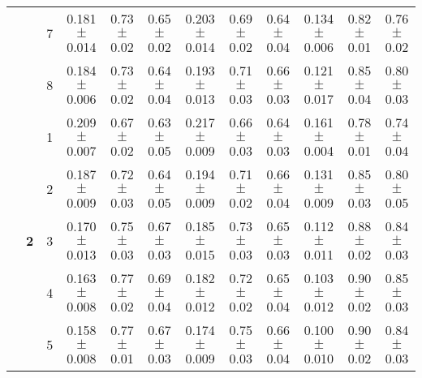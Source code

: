 \begin{table*}
{\begin{tabular}{|l|c|c||c|c|c||c|c|c||c|c|c|}
 & & 7 & \textcolor{gate_color}{0.181$\pm$0.014} & \textcolor{gate_color}{0.73$\pm$0.02} & \textcolor{gate_color}{0.65$\pm$0.02} & \textcolor{mixed_color}{0.203$\pm$0.014} & \textcolor{mixed_color}{0.69$\pm$0.02} & \textcolor{mixed_color}{0.64$\pm$0.04} & \textcolor{pulsed_color}{0.134$\pm$0.006} & \textcolor{pulsed_color}{0.82$\pm$0.01} & \textcolor{pulsed_color}{0.76$\pm$0.02} \\
 & & 8 & \textcolor{gate_color}{0.184$\pm$0.006} & \textcolor{gate_color}{0.73$\pm$0.02} & \textcolor{gate_color}{0.64$\pm$0.04} & \textcolor{mixed_color}{0.193$\pm$0.013} & \textcolor{mixed_color}{0.71$\pm$0.03} & \textcolor{mixed_color}{0.66$\pm$0.03} & \textcolor{pulsed_color}{0.121$\pm$0.017} & \textcolor{pulsed_color}{0.85$\pm$0.04} & \textcolor{pulsed_color}{0.80$\pm$0.03} \\
\cline{2-12}
 & \multirow{8}{*}{\textbf{2}} & 1 & \textcolor{gate_color}{0.209$\pm$0.007} & \textcolor{gate_color}{0.67$\pm$0.02} & \textcolor{gate_color}{0.63$\pm$0.05} & \textcolor{mixed_color}{0.217$\pm$0.009} & \textcolor{mixed_color}{0.66$\pm$0.03} & \textcolor{mixed_color}{0.64$\pm$0.03} & \textcolor{pulsed_color}{0.161$\pm$0.004} & \textcolor{pulsed_color}{0.78$\pm$0.01} & \textcolor{pulsed_color}{0.74$\pm$0.04} \\
 & & 2 & \textcolor{gate_color}{0.187$\pm$0.009} & \textcolor{gate_color}{0.72$\pm$0.03} & \textcolor{gate_color}{0.64$\pm$0.05} & \textcolor{mixed_color}{0.194$\pm$0.009} & \textcolor{mixed_color}{0.71$\pm$0.02} & \textcolor{mixed_color}{0.66$\pm$0.04} & \textcolor{pulsed_color}{0.131$\pm$0.009} & \textcolor{pulsed_color}{0.85$\pm$0.03} & \textcolor{pulsed_color}{0.80$\pm$0.05} \\
 & & 3 & \textcolor{gate_color}{0.170$\pm$0.013} & \textcolor{gate_color}{0.75$\pm$0.03} & \textcolor{gate_color}{0.67$\pm$0.03} & \textcolor{mixed_color}{0.185$\pm$0.015} & \textcolor{mixed_color}{0.73$\pm$0.03} & \textcolor{mixed_color}{0.65$\pm$0.03} & \textcolor{pulsed_color}{0.112$\pm$0.011} & \textcolor{pulsed_color}{0.88$\pm$0.02} & \textcolor{pulsed_color}{0.84$\pm$0.03} \\
 & & 4 & \textcolor{gate_color}{0.163$\pm$0.008} & \textcolor{gate_color}{0.77$\pm$0.02} & \textcolor{gate_color}{0.69$\pm$0.04} & \textcolor{mixed_color}{0.182$\pm$0.012} & \textcolor{mixed_color}{0.72$\pm$0.02} & \textcolor{mixed_color}{0.65$\pm$0.04} & \textcolor{pulsed_color}{0.103$\pm$0.012} & \textcolor{pulsed_color}{0.90$\pm$0.02} & \textcolor{pulsed_color}{0.85$\pm$0.03} \\
 & & 5 & \textcolor{gate_color}{0.158$\pm$0.008} & \textcolor{gate_color}{0.77$\pm$0.01} & \textcolor{gate_color}{0.67$\pm$0.03} & \textcolor{mixed_color}{0.174$\pm$0.009} & \textcolor{mixed_color}{0.75$\pm$0.03} & \textcolor{mixed_color}{0.66$\pm$0.04} & \textcolor{pulsed_color}{0.100$\pm$0.010} & \textcolor{pulsed_color}{0.90$\pm$0.02} & \textcolor{pulsed_color}{0.84$\pm$0.03} \\

\end{tabular}}
\end{table*}
